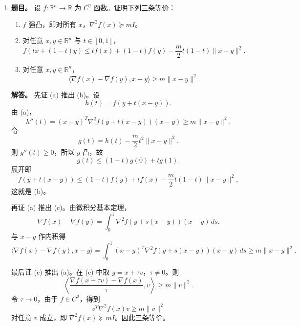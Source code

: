 ﻿\documentclass[UTF8,12pt]{ctexart}
\begin{document}
\begin{enumerate}[label=\textbf{\arabic*.},leftmargin=2.2em]
\textbf{解答。} 取 \(A\) 的标准正交特征向量组 \(q_1,\ldots,q_n\)，令
\[
x_k=\sum_j\alpha_jq_j,
\qquad
\tilde y_{k+1}=\sum_j\beta_jq_j.
\]
由扰动方程，
\[
(A-\lambda_i I)\tilde y_{k+1}
=x_k+(\mu-\lambda_i)\tilde y_{k+1}-\Delta A\tilde y_{k+1}.
\]
两边取范数并除以 \(\|\tilde y_{k+1}\|\)，得
\[
\frac{\|(A-\lambda_i I)\tilde y_{k+1}\|}{\|\tilde y_{k+1}\|}
\le
\frac1{\|\tilde y_{k+1}\|}+|\mu-\lambda_i|+\|\Delta A\|.
\]
再将扰动方程与 \(q_i\) 作内积：
\[
(\lambda_i-
\mu)\beta_i+q_i^T\Delta A\tilde y_{k+1}=\alpha_i.
\]
因此
\[
|\alpha_i|\le (|\lambda_i-
\mu|+\|\Delta A\|)\|\tilde y_{k+1}\|,
\]
从而只要当前迭代向量在 \(q_i\) 方向上有非零分量，就有
\[
\|\tilde y_{k+1}\|\ge
\frac{|\alpha_i|}{|\lambda_i-
\mu|+\|\Delta A\|}.
\]
对 \(j\ne i\)，由于 \(|\lambda_j-
\lambda_i|=O(1)\)，这些特征方向在 \((A-
\mu I+\Delta A)^{-1}\) 下只被有界放大；而 \(q_i\) 方向被 \(|\lambda_i-
\mu|+\|\Delta A\|\) 的倒数量级放大。故归一化后非 \(q_i\) 分量与主分量之比为
\[
O(|\lambda_i-
\mu|+\|\Delta A\|).
\]
由于 \(\|\Delta A\|=O(\varepsilon)\)，得到
\[
\left\|\frac{\tilde y_{k+1}}{\|\tilde y_{k+1}\|}\mp q_i\right\|
=O(|\lambda_i-
\mu|+\varepsilon).
\]

\item \textbf{题目。} 设 \(f:\mathbb R^n\to\mathbb R\) 为 \(C^2\) 函数。证明下列三条等价：
\begin{enumerate}[label=(\alph*),leftmargin=2.0em]
\item \(f\) 强凸，即对所有 \(x\)，\(\nabla^2f(x)\succeq mI\)。
\item 对任意 \(x,y\in\mathbb R^n\) 与 \(t\in[0,1]\)，
\[
f(tx+(1-t)y)\le tf(x)+(1-t)f(y)-\frac m2t(1-t)\|x-y\|^2.
\]
\item 对任意 \(x,y\in\mathbb R^n\)，
\[
\langle \nabla f(x)-\nabla f(y),x-y\rangle\ge m\|x-y\|^2.
\]
\end{enumerate}

\textbf{解答。} 先证 (a) 推出 (b)。设
\[
h(t)=f(y+t(x-y)).
\]
由 (a)，
\[
h''(t)=(x-y)^T\nabla^2f(y+t(x-y))(x-y)\ge m\|x-y\|^2.
\]
令
\[
g(t)=h(t)-\frac m2t^2\|x-y\|^2.
\]
则 \(g''(t)\ge0\)，所以 \(g\) 凸，故
\[
g(t)\le (1-t)g(0)+tg(1).
\]
展开即
\[
f(y+t(x-y))\le(1-t)f(y)+tf(x)-\frac m2t(1-t)\|x-y\|^2,
\]
这就是 (b)。

再证 (a) 推出 (c)。由微积分基本定理，
\[
\nabla f(x)-\nabla f(y)=\int_0^1\nabla^2f(y+s(x-y))(x-y)\,ds.
\]
与 \(x-y\) 作内积得
\[
\langle \nabla f(x)-\nabla f(y),x-y\rangle
=\int_0^1 (x-y)^T\nabla^2f(y+s(x-y))(x-y)\,ds
\ge m\|x-y\|^2.
\]

最后证 (c) 推出 (a)。在 (c) 中取 \(y=x+\tau v\)，\(\tau\ne0\)。则
\[
\left\langle
\frac{\nabla f(x+\tau v)-\nabla f(x)}{\tau},v
\right\rangle\ge m\|v\|^2.
\]
令 \(\tau\to0\)，由于 \(f\in C^2\)，得到
\[
v^T\nabla^2f(x)v\ge m\|v\|^2
\]
对任意 \(v\) 成立，即 \(\nabla^2f(x)\succeq mI\)。因此三条等价。
\end{enumerate}
\end{document}
